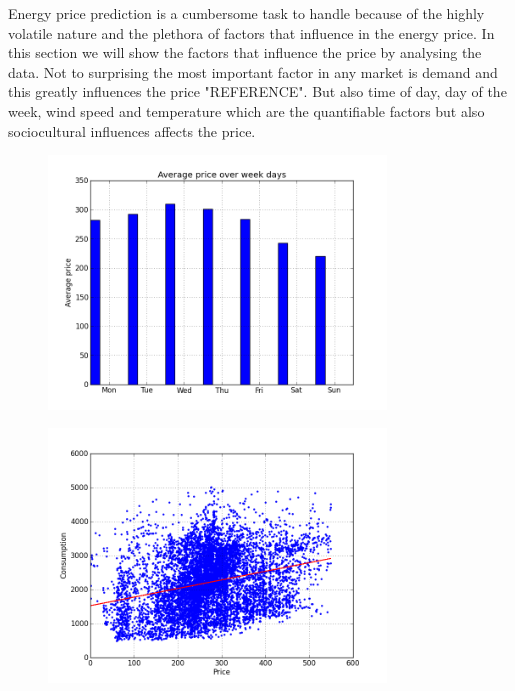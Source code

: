 Energy price prediction is a cumbersome task to handle because of the highly volatile nature and the plethora of factors that influence in the energy price. In this section we will show the factors that influence the price by analysing the data. Not to surprising the most important factor in any market is demand and this greatly influences the price "REFERENCE". But also time of day, day of the week, wind speed and temperature which are the quantifiable factors but also sociocultural influences affects the price.

\begin{figure}[h!]
\centering
\includegraphics[width=0.8\textwidth ,natwidth=410,natheight=237]{billeder/energy_price_plots/Average_price_over_weekdays.png}
\caption{}
\label{fig:}
\end{figure}

\begin{figure}[h!]
\centering
\includegraphics[width=0.8\textwidth ,natwidth=410,natheight=237]{billeder/energy_price_plots/consump_price.png}
\caption{}
\label{fig:}
\end{figure}

